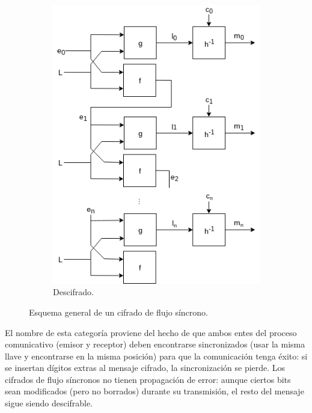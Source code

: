 \begin{figure}[H]
\begin{subfigure}{0.45\textwidth}
\begin{center}
      \includegraphics[width=0.9\linewidth]
        {contenidos/antecedentes/cifrados_de_flujo/diagramas/sincrono_descifrado.png}
      \caption{Descifrado.}
    \end{center}
  \end{subfigure}
  \caption{Esquema general de un cifrado de flujo síncrono.}
  \label{flujo_sincrono}
\end{figure}

El nombre de esta categoría proviene del hecho de que ambos entes del proceso
comunicativo (emisor y receptor) deben encontrarse sincronizados (usar la misma
llave y encontrarse en la misma posición) para que la comunicación tenga éxito:
si se insertan dígitos extras al mensaje cifrado, la sincronización se pierde.
Los cifrados de flujo síncronos no tienen propagación de error: aunque ciertos
bits sean modificados (pero no borrados) durante su transmisión, el resto del
mensaje sigue siendo descifrable.
